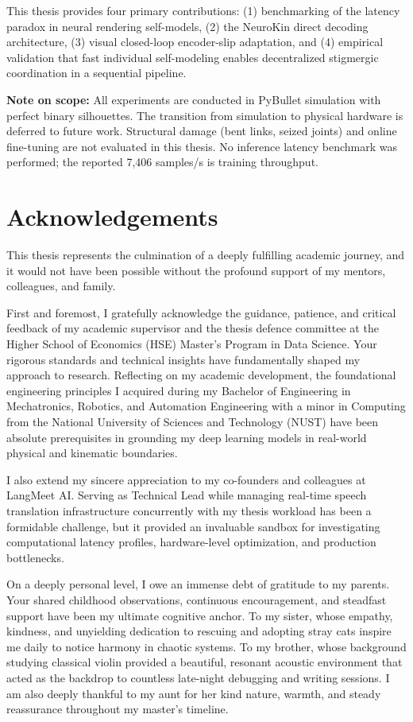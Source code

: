 \documentclass[12pt,a4paper,oneside]{report}
\begin{document}
This thesis provides four primary contributions: (1) benchmarking of the latency paradox in neural rendering self-models, (2) the NeuroKin direct decoding architecture, (3) visual closed-loop encoder-slip adaptation, and (4) empirical validation that fast individual self-modeling enables decentralized stigmergic coordination in a sequential pipeline.

\textbf{Note on scope:} All experiments are conducted in PyBullet simulation with perfect binary silhouettes. The transition from simulation to physical hardware is deferred to future work. Structural damage (bent links, seized joints) and online fine-tuning are not evaluated in this thesis. No inference latency benchmark was performed; the reported 7,406 samples/s is training throughput.

\clearpage

\chapter*{Acknowledgements}

This thesis represents the culmination of a deeply fulfilling academic journey, and it would not have been possible without the profound support of my mentors, colleagues, and family.

First and foremost, I gratefully acknowledge the guidance, patience, and critical feedback of my academic supervisor and the thesis defence committee at the Higher School of Economics (HSE) Master's Program in Data Science. Your rigorous standards and technical insights have fundamentally shaped my approach to research. Reflecting on my academic development, the foundational engineering principles I acquired during my Bachelor of Engineering in Mechatronics, Robotics, and Automation Engineering with a minor in Computing from the National University of Sciences and Technology (NUST) have been absolute prerequisites in grounding my deep learning models in real-world physical and kinematic boundaries.

I also extend my sincere appreciation to my co-founders and colleagues at LangMeet AI. Serving as Technical Lead while managing real-time speech translation infrastructure concurrently with my thesis workload has been a formidable challenge, but it provided an invaluable sandbox for investigating computational latency profiles, hardware-level optimization, and production bottlenecks.

On a deeply personal level, I owe an immense debt of gratitude to my parents. Your shared childhood observations, continuous encouragement, and steadfast support have been my ultimate cognitive anchor. To my sister, whose empathy, kindness, and unyielding dedication to rescuing and adopting stray cats inspire me daily to notice harmony in chaotic systems. To my brother, whose background studying classical violin provided a beautiful, resonant acoustic environment that acted as the backdrop to countless late-night debugging and writing sessions. I am also deeply thankful to my aunt for her kind nature, warmth, and steady reassurance throughout my master's timeline.
\end{document}
